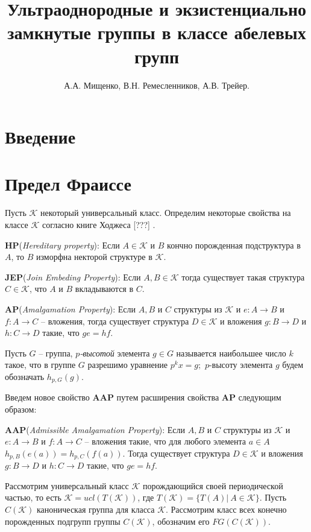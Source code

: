 \documentclass{article} %
\title{Ультраоднородные и экзистенциально замкнутые группы в классе абелевых групп}
\author{А.А. Мищенко, В.Н. Ремесленников, А.В. Трейер.}
\def\K{{\mathcal{K}}}
\def\HP{\textbf{HP}}
\def\JEP{\textbf{JEP}}
\def\AP{\textbf{AP}}
\def\AAP{\textbf{AAP}}
\begin{document}
\maketitle
\tableofcontents
\listoftodos



\section{Введение}

\section{Предел Фраиссе}

Пусть $\K$ некоторый универсальный класс. Определим некоторые свойства на классе $\K$ согласно книге Ходжеса [???] .

\noindent \HP  (\textit{Hereditary property}): Если $A \in \K$ и $B$ кончно порожденная подструктура в $A$, то $B$ изморфна некторой структуре в $\K$. 

\noindent \JEP  (\textit{Join Embeding Property}): Если $A, B \in \K$ тогда существует такая структура $C \in \K$, что $A$ и $B$ вкладываются в $C$.

\noindent \AP  (\textit{Amalgamation Property}): Если $A, B$ и $C$ структуры из $\K$ и $e : A \rightarrow B$ и $f : A \rightarrow C$ -- вложения, тогда существует структура $D \in \K$ и вложения $g : B \rightarrow D$ и $h : C \rightarrow D$ такие, что $ge = hf$. 

Пусть $G$ -- группа, \textit{$p$-высотой} элемента $g \in G$ называется наибольшее число $k$ такое, что в группе $G$ разрешимо уравнение $p^k x = g;$ $p$-высоту элемента $g$ будем обозначать $h_{p,G}(g).$ 

Введем новое свойство \AAP{} путем расширения свойства \AP{} следующим образом:

\noindent \AAP (\textit{Admissible Amalgamation Property}): Если $A, B$ и $C$ структуры из $\K$ и $e : A \rightarrow B$ и $f : A \rightarrow C$ -- вложения такие, что для любого элемента $a \in A$ $h_{p,B}(e(a)) = h_{p,C}(f(a))$. Тогда существует структура $D \in \K$ и вложения $g : B \rightarrow D$ и $h : C \rightarrow D$ такие, что $ge = hf$. 

Рассмотрим универсальный класс $\K$ порождающийся своей периодической частью, то есть $\K = ucl(T(\K))$, где $T(\K) = \{T(A) | \ A \in \K\}$. Пусть $C(\K)$ каноническая группа для класса $\K$. Рассмотрим класс всех конечно порожденных подгрупп группы $C(\K)$, обозначим его $FG(C(\K))$.
\end{document}
